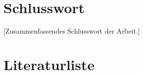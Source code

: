 \documentclass[pdftex,12pt,a4paper]{article}
\begin{document}


\newpage

\tableofcontents

\newpage







\newpage

\section{Schlusswort}
[Zusammenfassendes Schlusswort der Arbeit.]

\newpage

\section{Literaturliste}

\printbibliography

\newpage

\printglossary[numberedsection]
\end{document}
